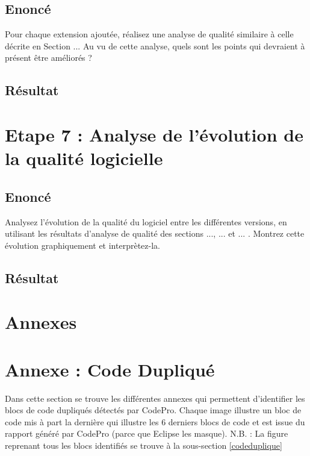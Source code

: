 \documentclass[12pt,a4paper,final]{article}
\begin{document}
\subsection{Enoncé} 
Pour chaque extension ajoutée, réalisez une analyse de qualité similaire à celle décrite en Section ... Au vu de cette analyse, quels sont les points qui devraient à présent être améliorés ?
\subsection{Résultat}



\newpage
\section{Etape 7 : Analyse de l'évolution de la qualité logicielle}\label{sec:etape7}
\subsection{Enoncé} 
Analysez l'évolution de la qualité du logiciel entre les différentes versions, en utilisant les résultats d'analyse de qualité des sections ..., ... et ... . Montrez cette évolution graphiquement et interprètez-la.
\subsection{Résultat}

\clearpage
\newpage
\section{Annexes} \label{sec:annexe}
\appendix %
\section{Annexe : Code Dupliqué}\label{SimilarCode}
Dans cette section se trouve les différentes annexes qui permettent d'identifier les blocs de code dupliqués détectés par CodePro. Chaque image illustre un bloc de code mis à part la dernière qui illustre les 6 derniers blocs de code et est issue du rapport généré par CodePro (parce que Eclipse les masque).
N.B. : La figure reprenant tous les blocs identifiés se trouve à la sous-section \ref{codeduplique}
\end{document}
